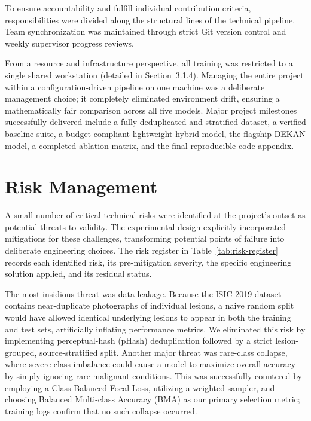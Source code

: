 To ensure accountability and fulfill individual contribution criteria, responsibilities were divided along the structural lines of the technical pipeline. Team synchronization was maintained through strict Git version control and weekly supervisor progress reviews. 

From a resource and infrastructure perspective, all training was restricted to a single shared workstation (detailed in Section~3.1.4). Managing the entire project within a configuration-driven pipeline on one machine was a deliberate management choice; it completely eliminated environment drift, ensuring a mathematically fair comparison across all five models. Major project milestones successfully delivered include a fully deduplicated and stratified dataset, a verified baseline suite, a budget-compliant lightweight hybrid model, the flagship DEKAN model, a completed ablation matrix, and the final reproducible code appendix.


\section{Risk Management}

A small number of critical technical risks were identified at the project's outset as potential threats to validity. The experimental design explicitly incorporated mitigations for these challenges, transforming potential points of failure into deliberate engineering choices. The risk register in Table~\ref{tab:risk-register} records each identified risk, its pre-mitigation severity, the specific engineering solution applied, and its residual status.

The most insidious threat was data leakage. Because the ISIC-2019 dataset contains near-duplicate photographs of individual lesions, a naive random split would have allowed identical underlying lesions to appear in both the training and test sets, artificially inflating performance metrics. We eliminated this risk by implementing perceptual-hash (pHash) deduplication followed by a strict lesion-grouped, source-stratified split. Another major threat was rare-class collapse, where severe class imbalance could cause a model to maximize overall accuracy by simply ignoring rare malignant conditions. This was successfully countered by employing a Class-Balanced Focal Loss, utilizing a weighted sampler, and choosing Balanced Multi-class Accuracy (BMA) as our primary selection metric; training logs confirm that no such collapse occurred.

